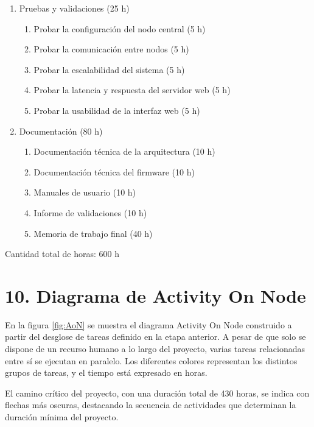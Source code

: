 \documentclass[
11pt, %
]{charter}
\begin{document}
\begin{enumerate}
\item Pruebas y validaciones (25 h)
	\begin{enumerate}
	\item Probar la configuración del nodo central (5 h)
	\item Probar la comunicación entre nodos (5 h)
	\item Probar la escalabilidad del sistema (5 h)
	\item Probar la latencia y respuesta del servidor web (5 h)
	\item Probar la usabilidad de la interfaz web (5 h)
	\end{enumerate}
	
\item Documentación (80 h)
	\begin{enumerate}
	\item Documentación técnica de la arquitectura (10 h)
	\item Documentación técnica del firmware (10 h)
	\item Manuales de usuario (10 h)
	\item Informe de validaciones (10 h)
	\item Memoria de trabajo final (40 h)
	\end{enumerate}
\end{enumerate}

Cantidad total de horas: 600 h

\section{10. Diagrama de Activity On Node}
\label{sec:AoN}

En la figura \ref{fig:AoN} se muestra el diagrama Activity On Node construido a partir del desglose de tareas definido en la etapa anterior. A pesar de que solo se dispone de un recurso humano a lo largo del proyecto, varias tareas relacionadas entre sí se ejecutan en paralelo. Los diferentes colores representan los distintos grupos de tareas, y el tiempo está expresado en horas.

El camino crítico del proyecto, con una duración total de 430 horas, se indica con flechas más oscuras, destacando la secuencia de actividades que determinan la duración mínima del proyecto.
\end{document}
